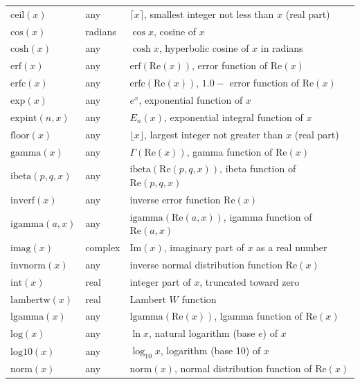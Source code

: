 \begin{center}
\begin{longtable}{lll}
        \(\text{ceil}(x)\) & any & $\lceil x \rceil$, smallest integer not less than $x$ (real part) \\
        \(\text{cos}(x)\) & radians & $\cos x$, cosine of $x$ \\
        \(\text{cosh}(x)\) & any & $\cosh x$, hyperbolic cosine of $x$ in radians \\
        \(\text{erf}(x)\) & any & $\text{erf}(\text{Re}(x))$, error function of $\text{Re}(x)$ \\
        \(\text{erfc}(x)\) & any & $\text{erfc}(\text{Re}(x))$, $1.0 - $ error function of $\text{Re}(x)$ \\
        \(\text{exp}(x)\) & any & $e^x$, exponential function of $x$ \\
        \(\text{expint}(n,x)\) & any & $E_n(x)$, exponential integral function of $x$ \\
        \(\text{floor}(x)\) & any & $\lfloor x \rfloor$, largest integer not greater than $x$ (real part) \\
        \(\text{gamma}(x)\) & any & $\Gamma(\text{Re}(x))$, gamma function of $\text{Re}(x)$ \\
        \(\text{ibeta}(p,q,x)\) & any & $\text{ibeta}(\text{Re}(p,q,x))$, ibeta function of $\text{Re}(p,q,x)$ \\
        \(\text{inverf}(x)\) & any & inverse error function $\text{Re}(x)$ \\
        \(\text{igamma}(a,x)\) & any & $\text{igamma}(\text{Re}(a,x))$, igamma function of $\text{Re}(a,x)$ \\
        \(\text{imag}(x)\) & complex & $\text{Im}(x)$, imaginary part of $x$ as a real number \\
        \(\text{invnorm}(x)\) & any & inverse normal distribution function $\text{Re}(x)$ \\
        \(\text{int}(x)\) & real & integer part of $x$, truncated toward zero \\
        \(\text{lambertw}(x)\) & real & Lambert $W$ function \\
        \(\text{lgamma}(x)\) & any & $\text{lgamma}(\text{Re}(x))$, lgamma function of $\text{Re}(x)$ \\
        \(\text{log}(x)\) & any & $\ln x$, natural logarithm (base $e$) of $x$ \\
        \(\text{log10}(x)\) & any & $\log_{10} x$, logarithm (base 10) of $x$ \\
        \(\text{norm}(x)\) & any & $\text{norm}(x)$, normal distribution function of $\text{Re}(x)$ \\

\end{longtable}
\end{center}
